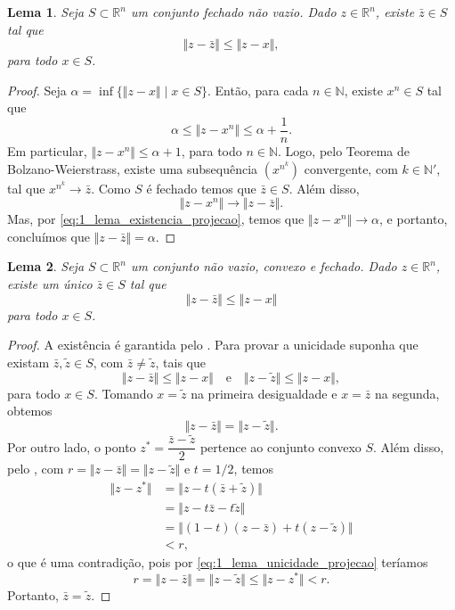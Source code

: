 \documentclass[12pt,a4paper]{scrartcl}
\def\RR{\mathds{R}}
\newtheorem{lema}{Lema}
\theoremstyle{definition}%
\begin{document}
\begin{lema} \label{lema:existencia_projecao}
Seja $S \subset \RR^{n}$ um conjunto fechado não vazio. Dado $z \in \RR^{n}$, existe $\bar{z} \in S$ tal que
\[
\Vert z - \bar{z} \Vert \leq \Vert z - x \Vert,
\]
para todo $x \in S$.
\end{lema}
\begin{proof}
Seja $\alpha = \inf \{\Vert z-x \Vert \mid x \in S\}$. Então, para cada $n \in \mathds{N}$, existe $x^{n} \in S$ tal que
\[ \label{eq:1_lema_existencia_projecao}
\alpha \leq \Vert z-x^{n} \Vert \leq \alpha + \dfrac{1}{n}. 
\]
Em particular, $\Vert z-x^{n} \Vert \leq \alpha + 1$, para todo $n \in \mathds{N}$. Logo, pelo Teorema de Bolzano-Weierstrass, existe uma subsequência $(x^{n^{k}})$ convergente, com $k \in \mathds{N}'$, tal que $x^{n^{k}} \longrightarrow \bar{z}$. Como $S$ é fechado temos que $\bar{z} \in S$. Além disso, 
\[
\Vert z-x^{n} \Vert \longrightarrow \Vert z-\bar{z} \Vert .
\]
Mas, por \eqref{eq:1_lema_existencia_projecao}, temos que $\Vert z-x^{n} \Vert \longrightarrow \alpha $, e portanto, concluímos que $\Vert z-\bar{z} \Vert = \alpha$.

\end{proof}


\begin{lema}  \label{lema:unicidadeprojecao_convexidade}
Seja $S \subset \RR^{n}$ um conjunto não vazio, convexo e fechado. Dado $z \in \RR^{n}$, existe um único $\bar{z} \in S$ tal que
\[
\Vert z - \bar{z} \Vert \leq \Vert z - x \Vert
\]
para todo $x \in S$.
\end{lema}
\begin{proof}
A existência é garantida pelo . Para provar a unicidade suponha que existam $\bar{z}, \tilde{z} \in S$, com $\bar{z} \neq \tilde{z}$, ta{}is que
\[ \label{eq:1_lema_unicidade_projecao}
\Vert z-\bar{z} \Vert \leq \Vert z-x \Vert \quad \text{e} \quad \Vert z-\tilde{z} \Vert \leq \Vert z-x \Vert ,
\]
para todo $x \in S$. Tomando $x=\tilde{z}$ na primeira desigualdade e $x=\bar{z}$ na segunda, obtemos
\[
\Vert z-\bar{z} \Vert = \Vert z-\tilde{z} \Vert .
\]
Por outro lado, o ponto $z^{*} = \dfrac{\bar{z} - \tilde{z}}{2}$ pertence ao conjunto convexo $S$. Além disso, pelo , com $r= \Vert z-\bar{z} \Vert = \Vert z - \tilde{z} \Vert$ e $t=1/2$, temos
\begin{align}
\Vert z-z^{*} \Vert &=  \Vert z-t(\bar{z}+\tilde{z}) \Vert \\
& = \Vert z - t\bar{z} - t\tilde{z} \Vert \\
& = \Vert (1-t)(z-\bar{z}) + t(z-\tilde{z}) \Vert \\
& < r ,
\end{align}
o que é uma contradição, pois por \eqref{eq:1_lema_unicidade_projecao} teríamos
\[
r = \Vert z-\bar{z} \Vert = \Vert z - \tilde{z} \Vert \leq \Vert z-z^{*} \Vert < r .
\]
Portanto, $\bar{z} = \tilde{z}$.
\end{proof}
\end{document}
